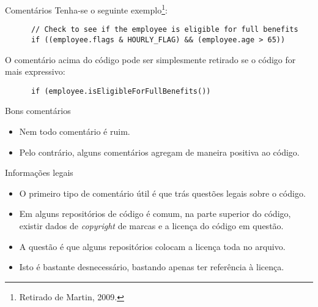 \documentclass[11pt]{beamer}
\begin{document}
  \begin{frame}[fragile]{Comentários}
    Tenha-se o seguinte exemplo\footnote{Retirado de Martin, 2009.}:
    \begin{lstlisting}
      // Check to see if the employee is eligible for full benefits
      if ((employee.flags & HOURLY_FLAG) && (employee.age > 65))
    \end{lstlisting}
    O comentário acima do código pode ser simplesmente retirado se o código for mais expressivo:
    \begin{lstlisting}
      if (employee.isEligibleForFullBenefits())
    \end{lstlisting}    
  \end{frame}

  \begin{frame}{Bons comentários}
    \begin{itemize}
      \item Nem todo comentário é ruim.
      \item Pelo contrário, alguns comentários agregam de maneira positiva ao código.
    \end{itemize}
  \end{frame}

  \begin{frame}{Informações legais}
    \begin{itemize}
      \item O primeiro tipo de comentário útil é que trás questões legais sobre o código.
      \item Em alguns repositórios de código é comum, na parte superior do código, existir dados de \textit{copyright} de marcas e a licença do código em questão.
      \item A questão é que alguns repositórios colocam a licença toda no arquivo.
      \item Isto é bastante desnecessário, bastando apenas ter referência à licença.
    \end{itemize}
  \end{frame}
\end{document}
